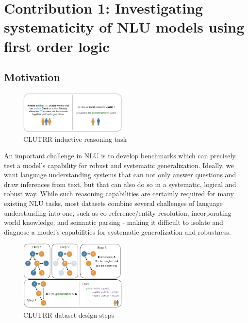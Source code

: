\documentclass[12pt]{article}
\begin{document}
\section{Contribution 1: Investigating systematicity of NLU models using first order logic}
\label{sec:cont1}

\subsection{Motivation}

\begin{figure}
\vspace{-20pt}
\begin{center}
  \includegraphics[width=0.48\textwidth]{images/clutrr_text.png}
\end{center}
\caption{CLUTRR inductive reasoning task}
\label{fig:clutrr_data}
\end{figure}

An important challenge in NLU is to develop benchmarks which can precisely test a model's capability for robust and systematic generalization. Ideally, we want language understanding systems that can not only answer questions and draw inferences from text, but that can also do so in a systematic, logical and robust way. While such reasoning capabilities are certainly required for many existing NLU tasks, most datasets combine several challenges of language understanding into one, such as co-reference/entity resolution, incorporating world knowledge, and semantic parsing - making it difficult to isolate and diagnose a model's capabilities for systematic generalization and robustness.

\begin{figure}
\vspace{-20pt}
\begin{center}
  \includegraphics[width=0.48\textwidth]{images/clutrr_dataset_proof.png}
\end{center}
\caption{CLUTRR dataset design steps}
\label{fig:clutrr_data_design}
\end{figure}
\end{document}
